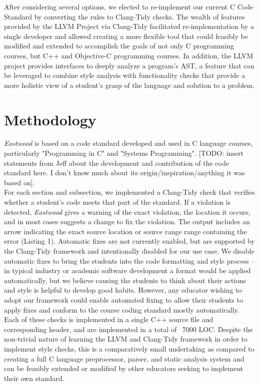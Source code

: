 \documentclass[sigconf]{acmart}
\begin{document}
After considering several options, we elected to re-implement our current C Code
Standard by converting the rules to Clang-Tidy \cite{ClangTidyChecks} checks.
The wealth of features provided by the LLVM Project via Clang-Tidy facilitated
re-implementation by a single developer and allowed creating a more flexible tool that
could feasibly be modified and extended to accomplish the goals of not only C
programming courses, but C++ and Objective-C programming courses. In addition, the LLVM
project provides interfaces to deeply analyze a program's AST, a feature that can be
leveraged to combine style analysis with functionality checks that provide a more
holistic view of a student's grasp of the language and solution to a problem.
\\

\section{Methodology}

\textit{Eastwood} is based on a code standard developed and used in C language courses,
particularly "Programming in C" and "Systems Programming".
[TODO: insert statements from Jeff about the development and contribution of the code standard here.
I don't know much about its origin/inspiration/anything it was based on].
\\

For each section and subsection, we implemented a Clang-Tidy check that verifies
whether a student's code meets that part of the standard. If a violation is detected,
\textit{Eastwood} gives a warning of the exact violation, the location it occurs, and in
most cases suggests a change to fix the violation. The output includes an arrow
indicating the exact source location or source range range containing the error
(Listing 1). Automatic fixes are not currently enabled, but are supported by the
Clang-Tidy framework and intentionally disabled for our use case. We disable automatic
fixes to bring the students into the code formatting and style process -- in typical
industry or academic software development a format would be applied automatically, but
we believe causing the students to think about their actions and style is helpful to
develop good habits. However, any educator wishing to adopt our framework could
enable automated fixing to allow their students to apply fixes and conform to the course
coding standard mostly automatically. Each of these checks is implemented in a single
C++ source file and corresponding header, and are implemented in a total of ~7000 LOC.
Despite the non-trivial nature of learning the LLVM and Clang-Tidy framework in order to
implement style checks, this is a comparatively small undertaking as compared to
creating a full C language preprocessor, parser, and static analysis system and can be
feasibly extended or modified by other educators seeking to implement their own
standard.
\\
\end{document}
